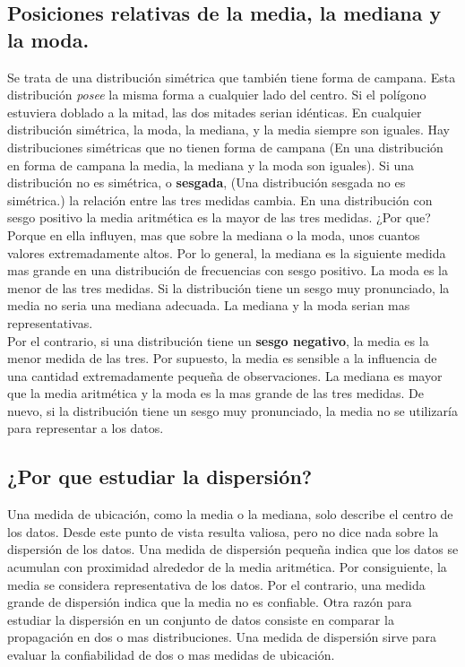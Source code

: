 \documentclass[]{article}
\begin{document}
\subsection{Posiciones relativas de la media, la mediana y la moda.}
Se trata de una distribución simétrica que también tiene forma de campana. Esta distribución \textit{posee} la misma forma a cualquier lado del centro. Si el polígono estuviera doblado a la mitad, las dos mitades serian idénticas. En cualquier distribución simétrica, la moda, la mediana, y la media siempre son iguales. Hay distribuciones simétricas que no tienen forma de campana (En una distribución en forma de campana la media, la mediana y la moda son iguales). Si una distribución no es simétrica, o \textbf{sesgada}, (Una distribución sesgada no es simétrica.) la relación entre las tres medidas cambia. En una distribución con sesgo positivo la media aritmética es la mayor de las tres medidas. ¿Por que? Porque en ella influyen, mas que sobre la mediana o la moda, unos cuantos valores extremadamente altos. Por lo general, la mediana es la siguiente medida mas grande en una distribución de frecuencias con sesgo positivo. La moda es la menor de las tres medidas. Si la distribución tiene un sesgo muy pronunciado, la media no seria una mediana adecuada. La mediana y la moda serian mas representativas. \\
Por el contrario, si una distribución tiene un \textbf{sesgo negativo}, la media es la menor medida de las tres. Por supuesto, la media es sensible a la influencia de una cantidad extremadamente pequeña de observaciones. La mediana es mayor que la media aritmética y la moda es la mas grande de las tres medidas. De nuevo, si la distribución tiene un sesgo muy pronunciado, la media no se utilizaría para representar a los datos.

\subsection{¿Por que estudiar la dispersión?}
Una medida de ubicación, como la media o la mediana, solo describe el centro de los datos. Desde este punto de vista resulta valiosa, pero no dice nada sobre la dispersión de los datos. Una medida de dispersión pequeña indica que los datos se acumulan con proximidad alrededor de la media aritmética. Por consiguiente, la media se considera representativa de los datos. Por el contrario, una medida grande de dispersión indica que la media no es confiable. Otra razón para estudiar la dispersión en un conjunto de datos consiste en comparar la propagación en dos o mas distribuciones. Una medida de dispersión sirve para evaluar la confiabilidad de dos o mas medidas de ubicación.
\end{document}
